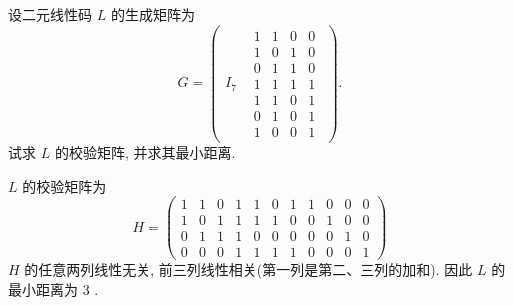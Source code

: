 \begin{exercise}
设二元线性码 $ L $ 的生成矩阵为
$$
G = \left(
\begin{array}{c|c}
I_7 & \begin{matrix}
1 & 1 & 0 & 0 \\
1 & 0 & 1 & 0 \\
0 & 1 & 1 & 0 \\
1 & 1 & 1 & 1 \\
1 & 1 & 0 & 1 \\
0 & 1 & 0 & 1 \\
1 & 0 & 0 & 1
\end{matrix}
\end{array}
\right).
$$
试求 $ L $ 的校验矩阵, 并求其最小距离.
\end{exercise}
\begin{solution}
 $ L $ 的校验矩阵为
$$
H=\left(\begin{array}{lllllll|llll}
1 & 1 & 0 & 1 & 1 & 0 & 1 & 1 & 0 & 0 & 0 \\
1 & 0 & 1 & 1 & 1 & 1 & 0 & 0 & 1 & 0 & 0 \\
0 & 1 & 1 & 1 & 0 & 0 & 0 & 0 & 0 & 1 & 0 \\
0 & 0 & 0 & 1 & 1 & 1 & 1 & 0 & 0 & 0 & 1
\end{array}\right)
$$
$ H $ 的任意两列线性无关, 前三列线性相关(第一列是第二、三列的加和). 因此 $ L $ 的最小距离为 3 .
\end{solution}

